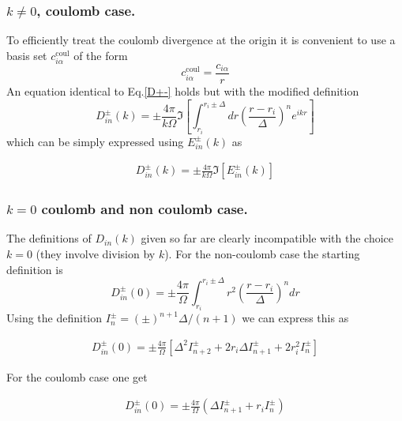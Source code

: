 \subsubsection{$k\ne 0$, coulomb case.}
To efficiently treat the coulomb divergence at the origin it is convenient to use
a basis set $c_{i\alpha}^{\text{coul}}$ of the form 
\begin{equation}
c_{i\alpha}^{\text{coul}}=\frac{c_{i\alpha}}{r}
\end{equation}
An equation identical to Eq.\ref{D+-} holds but with the modified definition
\begin{equation}
D_{in}^\pm(k)=\pm\frac{4\pi}{k\Omega}\Im\left[\int_{r_i}^{r_i\pm\Delta}
dr\left(\frac{r-r_i}{\Delta}\right)^n e^{ikr}\right]
\end{equation}
which can be simply expressed using $E^\pm_{in}(k)$ as
\vskip 3mm
\begin{center}
\begin{eqnarray}
D_{in}^\pm(k)=\pm\frac{4\pi}{k\Omega}\Im\left[E_{in}^\pm(k)\right]
\label{coulD+-}
\end{eqnarray}
\end{center}
\vskip 3mm
\subsubsection{$k=0$ coulomb and non coulomb case.}
The definitions of $D_{in}(k)$ given so far are clearly incompatible 
with the choice $k=0$ (they involve division by $k$). For the non-coulomb
case the starting definition is
\begin{equation}
D^\pm_{in}(0)=\pm\frac{4\pi}{\Omega}\int_{r_i}^{r_i\pm\Delta}r^2
\left(\frac{r-r_i}{\Delta}\right)^ndr
\end{equation}
Using the definition $I_n^\pm=(\pm)^{n+1}\Delta/(n+1)$ we can express this
as
\begin{center}
\vskip 3mm
\begin{eqnarray}
D^\pm_{in}(0)=\pm\frac{4\pi}{\Omega}\left[\Delta^2 I_{n+2}^\pm
+2r_i\Delta I_{n+1}^\pm+2r_i^2I_n^\pm\right]
\label{noncoul_k=0D+-}
\end{eqnarray}
\end{center}
\vskip 3mm
For the coulomb case one get

\vskip 3mm
\begin{center}
\begin{eqnarray}
D^\pm_{in}(0)=\pm\frac{4\pi}{\Omega}\left(
\Delta I^\pm_{n+1} + r_i I^\pm_n\right)
\label{coul_k=0D+-}
\end{eqnarray}
\end{center}
\vskip 3mm
